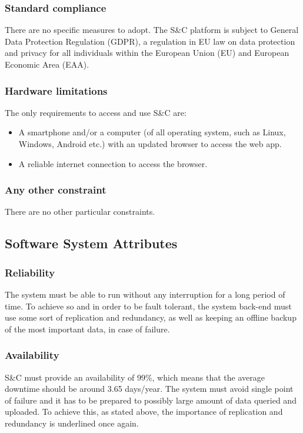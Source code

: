 \documentclass[12pt]{article}
\numberwithin{figure}{section}
\numberwithin{table}{section}
\begin{document}
\subsubsection{Standard compliance}
    There are no specific measures to adopt. The S\&C platform is subject to General Data Protection Regulation (GDPR), a regulation in EU law on data protection and privacy for all individuals within the European Union (EU) and European Economic Area (EAA).
\subsubsection{Hardware limitations}
    The only requirements to access and use S\&C are:
        \begin{itemize}
            \item A smartphone and/or a computer (of all operating system, such as Linux, Windows, Android etc.) with an updated browser to access the web app.
            \item A reliable internet connection to access the browser.
        \end{itemize}
\subsubsection{Any other constraint}
    There are no other particular constraints.
\subsection{Software System Attributes}

\subsubsection{Reliability}
    The system must be able to run without any interruption for a long period of time. To achieve so and in order to be fault tolerant, the system back-end must use some sort of replication and redundancy, as well as keeping an offline backup of the most important data, in case of failure.
    
\subsubsection{Availability}
    S\&C must provide an availability of 99\%, which means that the average downtime should be around 3.65 days/year. The system must avoid single point of failure and it has to be prepared to possibly large amount of data queried and uploaded. To achieve this, as stated above, the importance of replication and redundancy is underlined once again.
\end{document}
